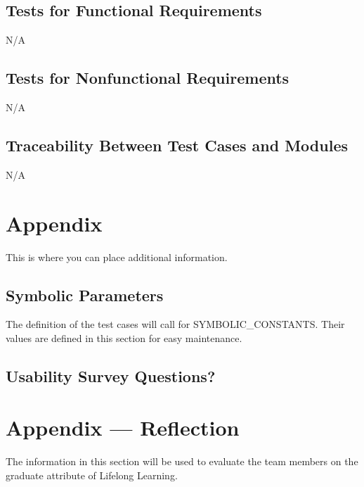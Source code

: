 \documentclass[12pt, titlepage]{article}
\begin{document}
\subsection{Tests for Functional Requirements}
N/A

\subsection{Tests for Nonfunctional Requirements}
N/A

\subsection{Traceability Between Test Cases and Modules}
N/A	





\newpage

\section{Appendix}

This is where you can place additional information.

\subsection{Symbolic Parameters}

The definition of the test cases will call for SYMBOLIC\_CONSTANTS.
Their values are defined in this section for easy maintenance.

\subsection{Usability Survey Questions?}


\newpage{}
\section*{Appendix --- Reflection}


The information in this section will be used to evaluate the team members on the
graduate attribute of Lifelong Learning.


\end{document}
